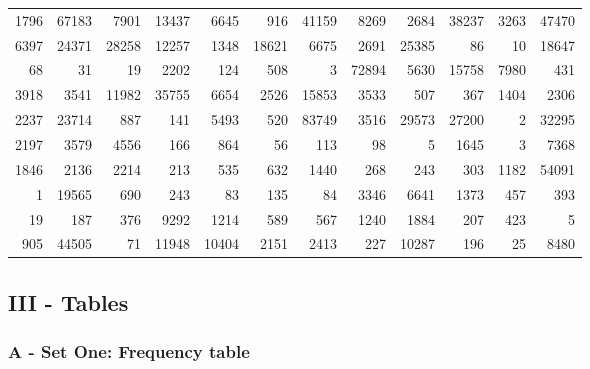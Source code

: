 \documentclass[10pt]{report}
\begin{document}
\begin{tabular}{rrrrrrrrrrrr}
    \hline
    1796 & 67183 &  7901 & 13437 &  6645 &   916 & 41159 &  8269 &  2684 & 38237 & 3263 & 47470 \\
    6397 & 24371 & 28258 & 12257 &  1348 & 18621 &  6675 &  2691 & 25385 &    86 &   10 & 18647 \\
    68 &    31 &    19 &  2202 &   124 &   508 &     3 & 72894 &  5630 & 15758 & 7980 &   431 \\
    3918 &  3541 & 11982 & 35755 &  6654 &  2526 & 15853 &  3533 &   507 &   367 & 1404 &  2306 \\
    2237 & 23714 &   887 &   141 &  5493 &   520 & 83749 &  3516 & 29573 & 27200 &    2 & 32295 \\
    2197 &  3579 &  4556 &   166 &   864 &    56 &   113 &    98 &     5 &  1645 &    3 &  7368 \\
    1846 &  2136 &  2214 &   213 &   535 &   632 &  1440 &   268 &   243 &   303 & 1182 & 54091 \\
    1 & 19565 &   690 &   243 &    83 &   135 &    84 &  3346 &  6641 &  1373 &  457 &   393 \\
    19 &   187 &   376 &  9292 &  1214 &   589 &   567 &  1240 &  1884 &   207 &  423 &     5 \\
    905 & 44505 &    71 & 11948 & 10404 &  2151 &  2413 &   227 & 10287 &   196 &   25 &  8480 \\
    \hline
\end{tabular}


\subsection*{III - Tables}

\subsubsection*{A - Set One: Frequency table}
\end{document}
